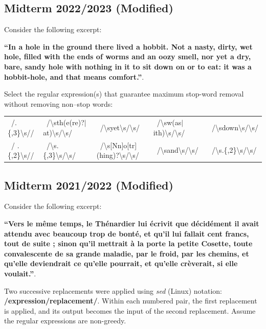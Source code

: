 \documentclass{../extra/aakpract/aakpract}
\begin{document}
	\subsection{Midterm 2022/2023 (Modified)}
	
	Consider the following excerpt:
	
	\textbf{``In a hole in the ground there lived a hobbit. Not a nasty, dirty, wet hole, filled with the ends of worms and an oozy smell, nor yet a dry, bare, sandy hole with nothing in it to sit down on or to eat: it was a hobbit-hole, and that means comfort.''}.
	
	Select the regular expression(s) that guarantee maximum stop-word removal without removing non–stop words:
	\begin{center}
		\begin{tabular}{|lllll|}
			\hline
			\Square\ /.\{,3\}\textbackslash s// & 
			\Square\ /\textbackslash sth(e(re)?$|$at)\textbackslash s/\textbackslash s/ & 
			\Square\ /\textbackslash syet\textbackslash s/\textbackslash s/ & 
			\Square\ /\textbackslash sw(as$|$ith)\textbackslash s/\textbackslash s/ &
			\Square\ /\textbackslash sdown\textbackslash s/\textbackslash s/ \\
			
			\Square\ / .\{,2\}\textbackslash s// &
			\Square\ /\textbackslash s.\{,3\}\textbackslash s/\textbackslash s/ &
			\Square\ /\textbackslash s[Nn]o[tr](hing)?\textbackslash s/\textbackslash s/ &
			\Square\ /\textbackslash sand\textbackslash s/\textbackslash s/ &
			\Square\ /\textbackslash s.\{,2\}\textbackslash s/\textbackslash s/ \\
			\hline
		\end{tabular}
	\end{center}
	
	\subsection{Midterm 2021/2022 (Modified)}
	
	Consider the following excerpt:
	
	\textbf{``Vers le même temps, le Thénardier lui écrivit que décidément il avait attendu avec beaucoup trop de bonté, et qu'il lui fallait cent francs, tout de suite ; sinon qu'il mettrait à la porte la petite Cosette, toute convalescente de sa grande maladie, par le froid, par les chemins, et qu'elle deviendrait ce qu'elle pourrait, et qu'elle crèverait, si elle voulait.''}.
	
	Two successive replacements were applied using \textit{sed} (Linux) notation: \textbf{/expression/replacement/}.  
	Within each numbered pair, the first replacement is applied, and its output becomes the input of the second replacement.  
	Assume the regular expressions are non-greedy.
	
\end{document}
